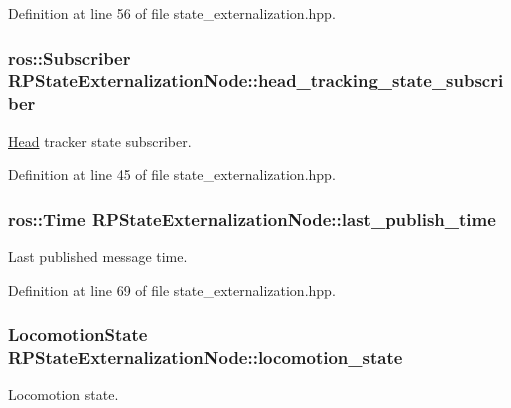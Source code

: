 \-Definition at line 56 of file state\-\_\-externalization.\-hpp.

\hypertarget{class_r_p_state_externalization_node_a198f8d63e01773bf468a72a291078ef2}{
\subsubsection[{head\-\_\-tracking\-\_\-state\-\_\-subscriber}]{\setlength{\rightskip}{0pt plus 5cm}ros\-::\-Subscriber {\bf \-R\-P\-State\-Externalization\-Node\-::head\-\_\-tracking\-\_\-state\-\_\-subscriber}}}\label{class_r_p_state_externalization_node_a198f8d63e01773bf468a72a291078ef2}
\hyperlink{struct_head}{\-Head} tracker state subscriber. 

\-Definition at line 45 of file state\-\_\-externalization.\-hpp.

\hypertarget{class_r_p_state_externalization_node_ad1fa73fa64e5dd3488a5d9075c7d1de4}{
\subsubsection[{last\-\_\-publish\-\_\-time}]{\setlength{\rightskip}{0pt plus 5cm}ros\-::\-Time {\bf \-R\-P\-State\-Externalization\-Node\-::last\-\_\-publish\-\_\-time}}}\label{class_r_p_state_externalization_node_ad1fa73fa64e5dd3488a5d9075c7d1de4}
\-Last published message time. 

\-Definition at line 69 of file state\-\_\-externalization.\-hpp.

\hypertarget{class_r_p_state_externalization_node_ae89a6c952f36c49d866003753abd715f}{
\subsubsection[{locomotion\-\_\-state}]{\setlength{\rightskip}{0pt plus 5cm}\-Locomotion\-State {\bf \-R\-P\-State\-Externalization\-Node\-::locomotion\-\_\-state}}}\label{class_r_p_state_externalization_node_ae89a6c952f36c49d866003753abd715f}
\-Locomotion state. 

